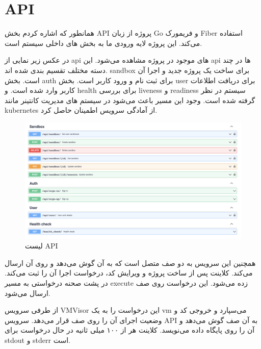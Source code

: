 
\section{API}

همانطور که اشاره کردم بخش API پروژه از زبان Go و فریمورک Fiber استفاده می‌کند.
این پروژه لایه ورودی ما به بخش های داخلی سیستم است.

در عکس زیر نمایی از api های موجود در پروژه مشاهده می‌شود.
این api ها در چند دسته مختلف تقسیم بندی شده اند. sandbox برای ساخت یک پروژه جدید و اجرا آن است.
بخش auth برای ثبت نام و ورود کاربر است.
بخش user برای دریافت اطلاعات کاربر وارد شده است.
و health برای بررسی liveness و readiness سیستم در نظر گرفته شده است.
وجود این مسیر باعث می‌شود در سیستم های مدیریت کانتینر مانند kubernetes از آمادگی سرویس اطمینان حاصل کرد.

\begin{figure}[htbp]
    \centering
    \includegraphics[width=1\textwidth]{./3-Design/swagger.png}
    \caption{لیست API}
    \label{fig:swagger}
\end{figure}

همچنین این سرویس به دو صف متصل است که به آن گوش می‌دهد و روی آن ارسال می‌کند.
کلاینت پس از ساخت پروژه و ویرایش کد، درخواست اجرا آن را ثبت  می‌کند. در پشت صحنه درخواستی به مسیر execute
زده می‌شود. این درخواست روی صف  ارسال می‌شود.

از طرفی سرویس VMVisor این درخواست را به یک vm می‌سپارد و خروجی کد و وضعیت اجرای آن را روی صف  قرار می‌دهد.
سرویس API به آن صف گوش می‌دهد و آن را روی پایگاه داده می‌نویسد.
کلاینت هر از ۱۰۰ میلی ثانیه در حال درخواست برای stdout و stderr است.
